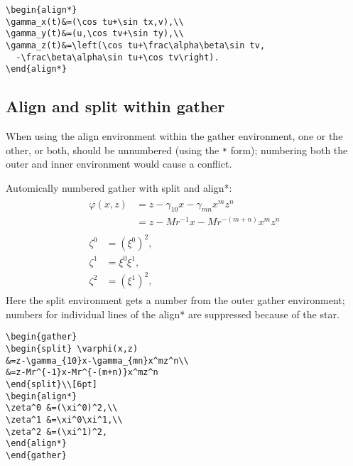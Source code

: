 \documentclass[draft]{amsart}
\newcommand{\ntt}{\normalfont\ttfamily}
\newcommand{\env}[1]{{\protect\ntt#1}}
\theoremstyle{definition}
\theoremstyle{remark}
\begin{document}
\begin{verbatim}
\begin{align*}
\gamma_x(t)&=(\cos tu+\sin tx,v),\\
\gamma_y(t)&=(u,\cos tv+\sin ty),\\
\gamma_z(t)&=\left(\cos tu+\frac\alpha\beta\sin tv,
  -\frac\beta\alpha\sin tu+\cos tv\right).
\end{align*}
\end{verbatim}

\newpage
\subsection{Align and split within gather}
When using the \env{align} environment within the \env{gather}
environment, one or the other, or both, should be unnumbered (using the
\verb|*| form); numbering both the outer and inner environment would
cause a conflict.

Automically numbered \env{gather} with \env{split} and \env{align*}:
\begin{gather}
\begin{split} \varphi(x,z)
&=z-\gamma_{10}x-\gamma_{mn}x^mz^n\\
&=z-Mr^{-1}x-Mr^{-(m+n)}x^mz^n
\end{split}\\[6pt]
\begin{align*}
\zeta^0 &=(\xi^0)^2,\\
\zeta^1 &=\xi^0\xi^1,\\
\zeta^2 &=(\xi^1)^2,
\end{align*}
\end{gather}
Here the \env{split} environment gets a number from the outer
\env{gather} environment; numbers for individual lines of the
\env{align*} are suppressed because of the star.

\begin{verbatim}
\begin{gather}
\begin{split} \varphi(x,z)
&=z-\gamma_{10}x-\gamma_{mn}x^mz^n\\
&=z-Mr^{-1}x-Mr^{-(m+n)}x^mz^n
\end{split}\\[6pt]
\begin{align*}
\zeta^0 &=(\xi^0)^2,\\
\zeta^1 &=\xi^0\xi^1,\\
\zeta^2 &=(\xi^1)^2,
\end{align*}
\end{gather}
\end{verbatim}
\end{document}
